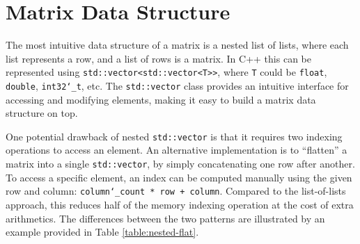 \documentclass[logo,bsc,singlespacing,parskip]{infthesis}
\newcommand{\dtint}{\texttt{int32\char`_t}}
\newcommand{\dtfloat}{\texttt{float}}
\newcommand{\dtdouble}{\texttt{double}}
\begin{document}
\section{Matrix Data Structure}
\label{sec:mat-structure}
The most intuitive data structure of a matrix is a nested list of lists, where each
list represents a row, and a list of rows is a matrix. In C++ this can be
represented using \texttt{std::vector<std::vector<T>>}, where \texttt{T} could
be \dtfloat{}, \dtdouble{}, \dtint{}, etc. The \texttt{std::vector}
class provides an intuitive interface for accessing and modifying elements,
making it easy to build a matrix data structure on top. 

One potential drawback of nested \texttt{std::vector} is that it requires two
indexing operations to access an element. An alternative implementation is to
“flatten” a matrix into a single \texttt{std::vector}, by simply concatenating
one row after another. To access a specific element, an index can be computed
manually using the given row and column: \texttt{column\char`_count * row + column}.
Compared to the list-of-lists approach, this reduces half of the memory indexing operation at the cost of extra
arithmetics. The differences between the two patterns are illustrated by an
example provided in Table \ref{table:nested-flat}. 
\end{document}
